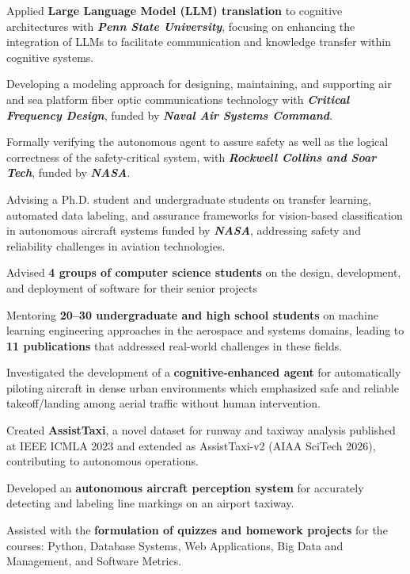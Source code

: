 \begin{cventries}
{\begin{cvitems}
\item Applied \textbf{Large Language Model (LLM) translation} to cognitive architectures with \textit{\textbf{Penn State University}}, focusing on enhancing the integration of LLMs to facilitate communication and knowledge transfer within cognitive systems.
\item Developing a modeling approach for designing, maintaining, and supporting air and sea platform fiber optic communications technology with \textit{\textbf{Critical Frequency Design}}, funded by \textit{\textbf{Naval Air Systems Command}}.
\item Formally verifying the autonomous agent to assure safety as well as the logical correctness of the safety-critical system, with \textit{\textbf{Rockwell Collins and Soar Tech}}, funded by \textit{\textbf{NASA}}.
\item Advising a Ph.D. student and undergraduate students on transfer learning, automated data labeling, and assurance frameworks for vision-based classification in autonomous aircraft systems funded by \textit{\textbf{NASA}}, addressing safety and reliability challenges in aviation technologies.
\item Advised \textbf{4 groups of computer science students} on the design, development, and deployment of software for their senior projects
\item Mentoring \textbf{20--30 undergraduate and high school students} on machine learning engineering approaches in the aerospace and systems domains, leading to \textbf{11 publications} that addressed real-world challenges in these fields.
\item Investigated the development of a \textbf{cognitive-enhanced agent} for automatically piloting aircraft in dense urban environments which emphasized safe and reliable takeoff/landing among aerial traffic without human intervention.
\item Created \textbf{AssistTaxi}, a novel dataset for runway and taxiway analysis published at IEEE ICMLA 2023 and extended as AssistTaxi-v2 (AIAA SciTech 2026), contributing to autonomous operations.
\item Developed an \textbf{autonomous aircraft perception system} for accurately detecting and labeling line markings on an airport taxiway.
\item Assisted with the \textbf{formulation of quizzes and homework projects} for the courses: Python, Database Systems, Web Applications, Big Data and Management, and Software Metrics.
\end{cvitems}
}


\end{cventries}
